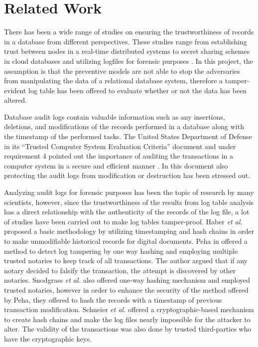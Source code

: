 
	\section {Related Work} \label{sec:related_work}
		There has been a wide range of studies on ensuring the trustworthiness of records in a database from different perspectives. These studies range from establishing trust between nodes in a real-time distributed systems \cite{khayat2017trust} to secret sharing schemes in cloud databases \cite{dutta2013privacy} and utilizing logfiles for forensic purposes \cite{sinha2014continuous}. In this project, the assumption is that the preventive models are not able to stop the adversaries from manipulating the data of a relational database system, therefore a tamper-evident log table has been offered to evaluate whether or not the data has been altered. 

		Database audit logs contain valuable information such as any insertions, deletions, and modifications of the records performed in a database along with the timestamp of the performed tasks. The United States Department of Defense in its “Trusted Computer System Evaluation Criteria” document and under requirement 4 pointed out the importance of auditing the transactions in a computer system in a secure and efficient manner \cite{USDoD1985}. In this document also protecting the audit logs from modification or destruction has been stressed out.

		Analyzing audit logs for forensic purposes has been the topic of research by many scientists, however, since the trustworthiness of the results from log table analysis has a direct relationship with the authenticity of the records of the log file, a lot of studies have been carried out to make log tables tamper-proof. Haber {\it et al.}\cite{haber1991how} proposed a basic methodology by utilizing timestamping and hash chains in order to make unmodifiable historical records for digital documents. Peha in \cite{peha1999electronic} offered a method to detect log tampering by one way hashing and employing multiple trusted notaries to keep track of all transactions. The author argued that if any notary decided to falsify the transaction, the attempt is discovered by other notaries. Snodgrass {\it et al.} \cite{snodgrass2004Tamper} also offered one-way hashing mechanism and employed trusted notaries, however in order to enhance the security of the method offered by Peha, they offered to hash the records with a timestamp of previous transaction modification. Schneier {\it et al.}\cite{schneier1998cryptoraphic} offered a cryptographic-based mechanism to create hash chains and make the log files nearly impossible for the attacker to alter. The validity of the transactions was also done by trusted third-parties who have the cryptographic keys.

